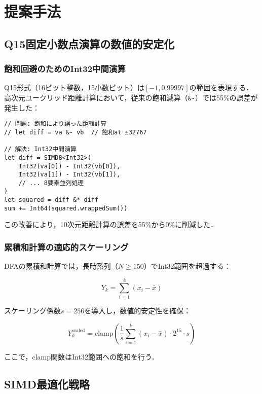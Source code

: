 \documentclass[paper]{ieice}
\begin{document}
\section{提案手法}

\subsection{Q15固定小数点演算の数値的安定化}

\subsubsection{飽和回避のためのInt32中間演算}
Q15形式（16ビット整数，15小数ビット）は$[-1, 0.99997]$の範囲を表現する．高次元ユークリッド距離計算において，従来の飽和減算（\verb|&-|）では55\%の誤差が発生した：

\begin{lstlisting}[caption=飽和問題を解決するInt32中間演算]
// 問題: 飽和により誤った距離計算
// let diff = va &- vb  // 飽和at ±32767

// 解決: Int32中間演算
let diff = SIMD8<Int32>(
    Int32(va[0]) - Int32(vb[0]),
    Int32(va[1]) - Int32(vb[1]),
    // ... 8要素並列処理
)
let squared = diff &* diff
sum += Int64(squared.wrappedSum())
\end{lstlisting}

この改善により，10次元距離計算の誤差を55\%から0\%に削減した．

\subsubsection{累積和計算の適応的スケーリング}
DFAの累積和計算では，長時系列（$N \geq 150$）でInt32範囲を超過する：

\begin{equation}
Y_k = \sum_{i=1}^{k} (x_i - \bar{x})
\end{equation}

スケーリング係数$s=256$を導入し，数値的安定性を確保：

\begin{equation}
Y_k^{\text{scaled}} = \text{clamp}\left(\frac{1}{s} \sum_{i=1}^{k} (x_i - \bar{x}) \cdot 2^{15} \cdot s\right)
\end{equation}

ここで，clamp関数はInt32範囲への飽和を行う．

\subsection{SIMD最適化戦略}
\end{document}

